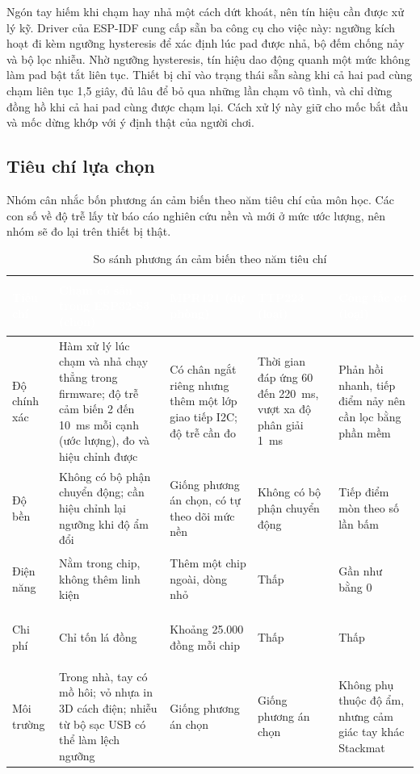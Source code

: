 Ngón tay hiếm khi chạm hay nhả một cách dứt khoát, nên tín hiệu cần được xử lý kỹ. Driver của ESP-IDF cung cấp sẵn ba công cụ cho việc này: ngưỡng kích hoạt đi kèm ngưỡng hysteresis để xác định lúc pad được nhả, bộ đếm chống nảy và bộ lọc nhiễu. Nhờ ngưỡng hysteresis, tín hiệu dao động quanh một mức không làm pad bật tắt liên tục. Thiết bị chỉ vào trạng thái sẵn sàng khi cả hai pad cùng chạm liên tục 1,5 giây, đủ lâu để bỏ qua những lần chạm vô tình, và chỉ dừng đồng hồ khi cả hai pad cùng được chạm lại. Cách xử lý này giữ cho mốc bắt đầu và mốc dừng khớp với ý định thật của người chơi.

\subsection{Tiêu chí lựa chọn}
Nhóm cân nhắc bốn phương án cảm biến theo năm tiêu chí của môn học. Các con số về độ trễ lấy từ báo cáo nghiên cứu nền và mới ở mức ước lượng, nên nhóm sẽ đo lại trên thiết bị thật.

\begin{table}[H]
    \centering
    \small
    \renewcommand{\arraystretch}{1.4}
    \caption{So sánh phương án cảm biến theo năm tiêu chí}
    \label{tab:sensor-criteria}
    \begin{tabular}{>{\bfseries\raggedright\arraybackslash}m{2.0cm} >{\raggedright\arraybackslash}m{3.1cm} >{\raggedright\arraybackslash}m{2.9cm} >{\raggedright\arraybackslash}m{2.7cm} >{\raggedright\arraybackslash}m{2.7cm}}
        \toprule
        \rowcolor{haitayblue}
        \textcolor{white}{Tiêu chí} & \textcolor{white}{Chạm có sẵn trong ESP32-S3 (chọn)} & \textcolor{white}{MPR121 (dự phòng)} & \textcolor{white}{TTP223 (loại)} & \textcolor{white}{Công tắc cơ (loại)} \\
        \midrule
        \rowcolor{haitayblue!8}
        Độ chính xác & Hàm xử lý lúc chạm và nhả chạy thẳng trong firmware; độ trễ cảm biến 2 đến 10~ms mỗi cạnh (ước lượng), đo và hiệu chỉnh được & Có chân ngắt riêng nhưng thêm một lớp giao tiếp I2C; độ trễ cần đo & Thời gian đáp ứng 60 đến 220~ms, vượt xa độ phân giải 1~ms & Phản hồi nhanh, tiếp điểm nảy nên cần lọc bằng phần mềm \\
        Độ bền & Không có bộ phận chuyển động; cần hiệu chỉnh lại ngưỡng khi độ ẩm đổi & Giống phương án chọn, có tự theo dõi mức nền & Không có bộ phận chuyển động & Tiếp điểm mòn theo số lần bấm \\
        \rowcolor{haitayblue!8}
        Điện năng & Nằm trong chip, không thêm linh kiện & Thêm một chip ngoài, dòng nhỏ & Thấp & Gần như bằng 0 \\
        Chi phí & Chỉ tốn lá đồng & Khoảng 25.000 đồng mỗi chip & Thấp & Thấp \\
        \rowcolor{haitayblue!8}
        Môi trường & Trong nhà, tay có mồ hôi; vỏ nhựa in 3D cách điện; nhiễu từ bộ sạc USB có thể làm lệch ngưỡng & Giống phương án chọn & Giống phương án chọn & Không phụ thuộc độ ẩm, nhưng cảm giác tay khác Stackmat \\
        \bottomrule
    \end{tabular}
\end{table}

